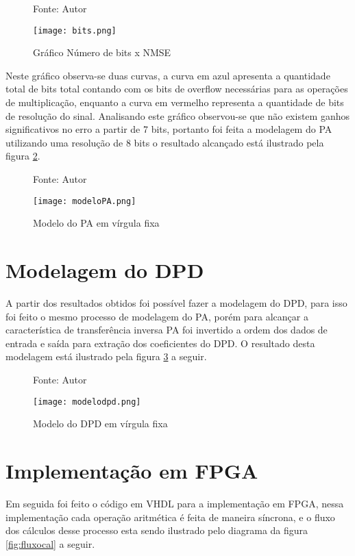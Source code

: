 \begin{figure}[ht!]
    \centering
    \captionsetup{justification=centering}
    \caption*{Fonte: Autor}
    \texttt{[image: bits.png]}
    \caption{Gráfico Número de bits x NMSE}
    \label{fig:bits}
\end{figure}

Neste gráfico observa-se duas curvas, a curva em azul apresenta a quantidade total de bits total contando com os bits de overflow necessárias para as operações de multiplicação, enquanto a curva em vermelho representa a quantidade de bits de resolução do sinal. Analisando este gráfico observou-se que não existem ganhos significativos no erro a partir de 7 bits, portanto foi feita a modelagem do PA utilizando uma resolução de 8 bits o resultado alcançado está ilustrado pela figura \ref{fig:modelopa}.

\begin{figure}[ht!]
    \centering
    \captionsetup{justification=centering}
    \caption*{Fonte: Autor}
    \texttt{[image: modeloPA.png]}
    \caption{Modelo do PA em vírgula fixa}
    \label{fig:modelopa}
\end{figure}

\section{Modelagem do DPD}
A partir dos resultados obtidos foi possível fazer a modelagem do DPD, para isso foi feito o mesmo processo de modelagem do PA, porém para alcançar a característica de transferência inversa PA foi invertido a ordem dos dados de entrada e saída para extração dos coeficientes do DPD. O resultado desta modelagem está ilustrado pela figura \ref{fig:modelodpd} a seguir.

\begin{figure}[H]
    \centering
    \captionsetup{justification=centering}
    \caption*{Fonte: Autor}
    \texttt{[image: modelodpd.png]}
    \caption{Modelo do DPD em vírgula fixa}
    \label{fig:modelodpd}
\end{figure}

\section{Implementação em FPGA}
Em seguida foi feito o código em VHDL para a implementação em FPGA, nessa implementação cada operação aritmética é feita de maneira síncrona, e o fluxo dos cálculos desse processo esta sendo ilustrado pelo diagrama da figura \ref{fig:fluxocal} a seguir.

